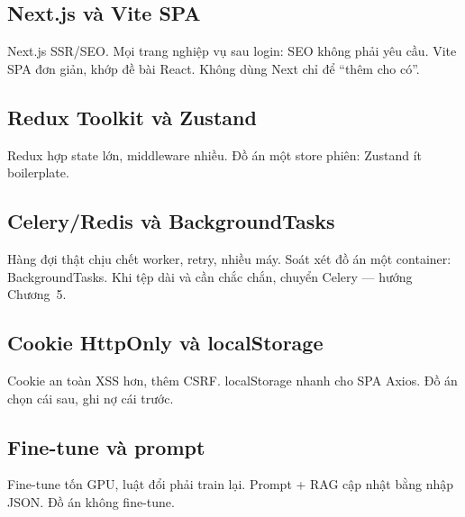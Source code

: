 \subsection{Next.js và Vite SPA}

Next.js SSR/SEO. Mọi trang nghiệp vụ sau login: SEO không phải yêu cầu. Vite SPA
đơn giản, khớp đề bài React. Không dùng Next chỉ để ``thêm cho có''.

\subsection{Redux Toolkit và Zustand}

Redux hợp state lớn, middleware nhiều. Đồ án một store phiên: Zustand ít boilerplate.

\subsection{Celery/Redis và BackgroundTasks}

Hàng đợi thật chịu chết worker, retry, nhiều máy. Soát xét đồ án một container:
BackgroundTasks. Khi tệp dài và cần chắc chắn, chuyển Celery --- hướng Chương~5.

\subsection{Cookie HttpOnly và localStorage}

Cookie an toàn XSS hơn, thêm CSRF. localStorage nhanh cho SPA Axios. Đồ án chọn
cái sau, ghi nợ cái trước.

\subsection{Fine-tune và prompt}

Fine-tune tốn GPU, luật đổi phải train lại. Prompt + RAG cập nhật bằng nhập
JSON. Đồ án không fine-tune.
